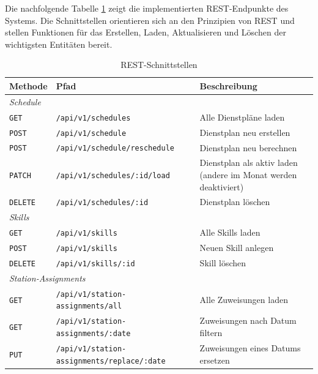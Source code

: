 Die nachfolgende Tabelle \ref{tab:rest-api} zeigt die implementierten REST-Endpunkte des Systems. Die Schnittstellen orientieren sich an den Prinzipien von REST und stellen Funktionen für das Erstellen, Laden, Aktualisieren und Löschen der wichtigsten Entitäten bereit.
\begin{table}[H]
	\centering
	\caption{REST-Schnittstellen}\label{tab:rest-api}
	\begin{tabularx}{\linewidth}{l >{\raggedright\arraybackslash}X >{\raggedright\arraybackslash}X}
		\toprule
		\textbf{Methode} & \textbf{Pfad} & \textbf{Beschreibung} \\
		\midrule
		\multicolumn{3}{l}{\textit{Schedule}} \\
		\midrule
		\texttt{GET}    & \texttt{/api/v1/schedules}                         & Alle Dienstpläne laden \\[2pt]
		\texttt{POST}   & \texttt{/api/v1/schedule}                          & Dienstplan neu erstellen \\
		\texttt{POST}   & \texttt{/api/v1/schedule/reschedule}               & Dienstplan neu berechnen \\
		\texttt{PATCH}  & \texttt{/api/v1/schedules/:id/load}                & Dienstplan als aktiv laden (andere im Monat werden deaktiviert) \\
		\texttt{DELETE} & \texttt{/api/v1/schedules/:id}                     & Dienstplan löschen \\
		\midrule
		\multicolumn{3}{l}{\textit{Skills}} \\
		\midrule
		\texttt{GET}    & \texttt{/api/v1/skills}                            & Alle Skills laden \\
		\texttt{POST}   & \texttt{/api/v1/skills}                            & Neuen Skill anlegen \\
		\texttt{DELETE} & \texttt{/api/v1/skills/:id}                        & Skill löschen \\
		\midrule
		\multicolumn{3}{l}{\textit{Station-Assignments}} \\
		\midrule
		\texttt{GET}    & \texttt{/api/v1/station-assignments/all}           & Alle Zuweisungen laden \\
		\texttt{GET}    & \texttt{/api/v1/station-assignments/:date}               & Zuweisungen nach Datum filtern \\
		\texttt{PUT}    & \texttt{/api/v1/station-assignments\newline/replace/:date} & Zuweisungen eines Datums ersetzen \\
		\midrule

\end{tabularx}
\end{table}
